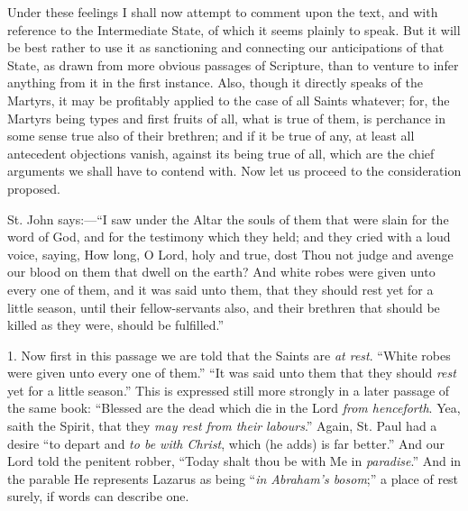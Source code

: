 Under these feelings I shall now attempt to comment upon the text,
and with reference to the Intermediate State, of which it seems
plainly to speak. But it will be best rather to use it as sanctioning
and connecting our anticipations of that State, as drawn from more
obvious passages of Scripture, than to venture to infer anything from
it in the first instance. Also, though it directly speaks of the
Martyrs, it may be profitably applied to the case of all Saints
whatever; for, the Martyrs being types and first fruits of all, what
is true of them, is perchance in some sense true also of their
brethren; and if it be true of any, at least all antecedent objections
vanish, against its being true of all, which are the chief arguments
we shall have to contend with. Now let us proceed to the consideration
proposed.

St. John says:—``I saw under the Altar the souls of them that
were slain for the word of God, and for the testimony which they held;
and they cried with a loud voice, saying, How long, O Lord, holy and
true, dost Thou not judge and avenge our blood on them that dwell on
the earth? And white robes were given unto every one of them, and it
was said unto them, that they should rest yet for a little season,
until their fellow-servants also, and their brethren that should be
killed as they were, should be fulfilled.''

1. Now first in this passage we are told that the Saints are \emph{at
rest}.
``White robes were given unto every one of them.'' ``It
was said unto them that they should \emph{rest} yet for a little
season.'' This is expressed still more strongly in a later passage
of the same book: ``Blessed are the dead which die in the Lord \emph{from
henceforth}. Yea, saith the Spirit, that they \emph{may rest from
their labours}.'' Again, St. Paul had a desire ``to depart
and \emph{to be with Christ}, which (he adds) is far better.'' And
our Lord told the penitent robber, ``Today shalt thou be with Me
in \emph{paradise}.'' And in the parable He represents Lazarus as
being ``\emph{in Abraham's bosom};'' a place of rest surely,
if words can describe one.

